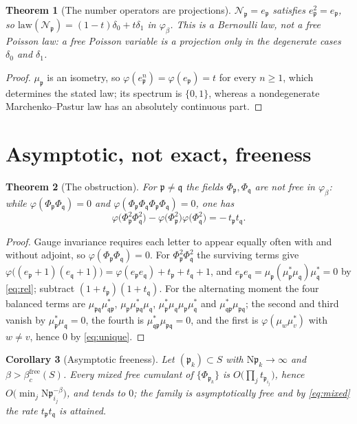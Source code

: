 \documentclass[11pt]{amsart}
\numberwithin{equation}{section}
\newtheorem{theorem}{Theorem}[section]
\newtheorem{corollary}[theorem]{Corollary}
\theoremstyle{definition}
\theoremstyle{remark}
\newcommand{\cN}{\mathcal{N}}
\newcommand{\pp}{\mathfrak{p}}
\newcommand{\qq}{\mathfrak{q}}
\newcommand{\Ns}{\mathrm{N}}
\newcommand{\bfree}{\beta_c^{\mathrm{free}}}
\begin{document}
\begin{theorem}[The number operators are projections]\label{thm:bernoulli}
$\cN_\pp=e_\pp$ satisfies $e_\pp^2=e_\pp$, so
$\mathrm{law}(\cN_\pp)=(1-t)\delta_0+t\delta_1$ in $\varphi_\beta$. This is a Bernoulli law,
not a free Poisson law: a free Poisson variable is a projection only in the degenerate cases
$\delta_0$ and $\delta_1$.
\end{theorem}

\begin{proof}
$\mu_\pp$ is an isometry, so $\varphi(e_\pp^n)=\varphi(e_\pp)=t$ for every $n\ge1$, which
determines the stated law; its spectrum is $\{0,1\}$, whereas a nondegenerate
Marchenko--Pastur law has an absolutely continuous part.
\end{proof}

\section{Asymptotic, not exact, freeness}

\begin{theorem}[The obstruction]\label{thm:notfree}
For $\pp\ne\qq$ the fields $\Phi_\pp,\Phi_\qq$ are not free in $\varphi_\beta$: while
$\varphi(\Phi_\pp\Phi_\qq)=0$ and $\varphi(\Phi_\pp\Phi_\qq\Phi_\pp\Phi_\qq)=0$, one has
\begin{equation}\label{eq:mixed}
\varphi\bigl(\Phi_\pp^2\Phi_\qq^2\bigr)-\varphi\bigl(\Phi_\pp^2\bigr)\varphi\bigl(\Phi_\qq^2\bigr)=-\,t_\pp t_\qq .
\end{equation}
\end{theorem}

\begin{proof}
Gauge invariance requires each letter to appear equally often with and without adjoint, so
$\varphi(\Phi_\pp\Phi_\qq)=0$. For $\Phi_\pp^2\Phi_\qq^2$ the surviving terms give
$\varphi\bigl((e_\pp+1)(e_\qq+1)\bigr)=\varphi(e_\pp e_\qq)+t_\pp+t_\qq+1$, and
$e_\pp e_\qq=\mu_\pp(\mu_\pp^*\mu_\qq)\mu_\qq^*=0$ by \eqref{eq:rel}; subtract
$(1+t_\pp)(1+t_\qq)$. For the alternating moment the four balanced terms are
$\mu_{\pp\qq}\mu_{\qq\pp}^*$, $\mu_\pp\mu_{\pp\qq}^*\mu_\qq$,
$\mu_\pp^*\mu_\qq\mu_\pp\mu_\qq^*$ and $\mu_{\qq\pp}^*\mu_{\pp\qq}$; the second and third
vanish by $\mu_\pp^*\mu_\qq=0$, the fourth is $\mu_{\qq\pp}^*\mu_{\pp\qq}=0$, and the
first is $\varphi(\mu_w\mu_v^*)$ with $w\ne v$, hence $0$ by \eqref{eq:unique}.
\end{proof}

\begin{corollary}[Asymptotic freeness]\label{cor:asympfree}
Let $(\pp_k)\subset S$ with $\Ns\pp_k\to\infty$ and $\beta>\bfree(S)$. Every mixed free
cumulant of $\{\Phi_{\pp_k}\}$ is $O\bigl(\prod_jt_{\pp_{i_j}}\bigr)$, hence
$O\bigl(\min_j\Ns\pp_{i_j}^{-\beta}\bigr)$, and tends to $0$; the family is asymptotically
free and by \eqref{eq:mixed} the rate $t_\pp t_\qq$ is attained.
\end{corollary}
\end{document}
